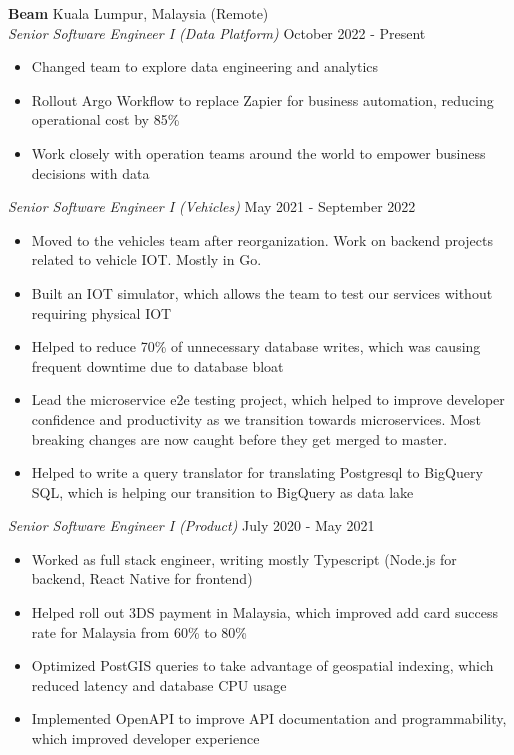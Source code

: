 \documentclass[a4paper]{article}
\begin{document}
\textbf{Beam} \hfill Kuala Lumpur, Malaysia (Remote)\\
\textit{Senior Software Engineer I (Data Platform)} \hfill October 2022 - Present\\
\vspace{-1mm}
\begin{itemize} \itemsep 1pt
	\item Changed team to explore data engineering and analytics
	\item Rollout Argo Workflow to replace Zapier for business automation, reducing operational cost by 85\%
	\item Work closely with operation teams around the world to empower business decisions with data
\end{itemize}
\textit{Senior Software Engineer I (Vehicles)} \hfill May 2021 - September 2022\\
\vspace{-1mm}
\begin{itemize} \itemsep 1pt
	\item Moved to the vehicles team after reorganization. Work on backend projects related to vehicle IOT. Mostly in Go.
	\item Built an IOT simulator, which allows the team to test our services without requiring physical IOT
	\item Helped to reduce 70\% of unnecessary database writes, which was causing frequent downtime due to database bloat
	\item Lead the microservice e2e testing project, which helped to improve developer confidence and productivity as we transition towards microservices. Most breaking changes are now caught before they get merged to master.
	\item Helped to write a query translator for translating Postgresql to BigQuery SQL, which is helping our transition to BigQuery as data lake
\end{itemize}
\textit{Senior Software Engineer I (Product)} \hfill July 2020 - May 2021\\
\vspace{-1mm}
\begin{itemize} \itemsep 1pt
	\item Worked as full stack engineer, writing mostly Typescript (Node.js for backend, React Native for frontend)
	\item Helped roll out 3DS payment in Malaysia, which improved add card success rate for Malaysia from 60\% to 80\%
	\item Optimized PostGIS queries to take advantage of geospatial indexing, which reduced latency and database CPU usage
	\item Implemented OpenAPI to improve API documentation and programmability, which improved developer experience
\end{itemize}
\end{document}
